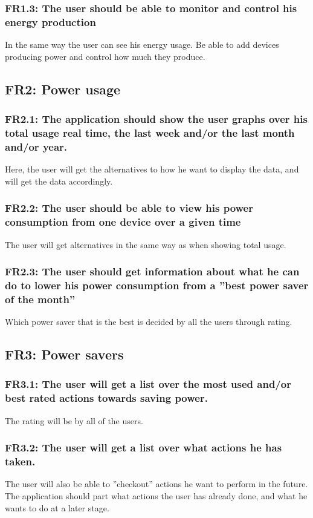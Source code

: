 \subsubsection{FR1.3: The user should be able to monitor and control his energy production}
In the same way the user can see his energy usage. Be able to add devices producing power and control how much they produce.


\subsection{FR2: Power usage}
\subsubsection{FR2.1: The application should show the user graphs over his total usage real time, the last week and/or the last month and/or year.}
Here, the user will get the alternatives to how he want to display the data, and will get the data accordingly.

\subsubsection{FR2.2: The user should be able to view his power consumption from one device over a given time}
The user will get alternatives in the same way as when showing total usage.

\subsubsection{FR2.3: The user should get information about what he can do to lower his power consumption from a ''best power saver of the month''}
 Which power saver that is the best is decided by all the users through rating.

\subsection{FR3: Power savers}

\subsubsection{FR3.1: The user will get a list over the most used and/or best rated actions towards saving power.}
The rating will be by all of the users.

\subsubsection{FR3.2: The user will get a list over what actions he has taken.}
The user will also be able to ''checkout'' actions he want to perform in the future. The application should part what actions the user has already done, and what he wants to do at a later stage.

